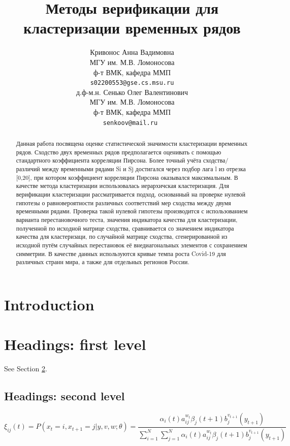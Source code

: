 \documentclass{article}
\title{Методы верификации для кластеризации временных рядов }
\author{ Кривонос Анна Вадимовна  \\
	МГУ им. М.В. Ломоносова\\
	ф-т ВМК, кафедра ММП\\
	\texttt{s02200553@gse.cs.msu.ru} \\
	\And
	д.ф-м.н. Сенько Олег Валентинович \\
	МГУ им. М.В. Ломоносова\\
	ф-т ВМК, кафедра ММП\\
	\texttt{senkoov@mail.ru } \\
}
\date{}
\begin{document}
\maketitle

\begin{abstract}
Данная работа посвящена оценке статистической значимости кластеризации временных рядов. Сходство двух временных рядов  предполагается оценивать с помощью стандартного коэффициента корреляции Пирсона. Более точный учёта сходства/различий между временными рядами Si и Sj достигался через подбор лага l из отрезка [0,20], при котором коэффициент корреляции Пирсона оказывался максимальным. В качестве метода кластеризации использовалась иерархичская кластеризация. Для верификации кластеризации рассматривается подход, основанный на проверке нулевой гипотезы о равновероятности различных соответствий мер сходства между двумя временными рядами. Проверка такой нулевой гипотезы производится с использованием варианта перестановочного теста, значения индикатора качества для кластеризации, полученной по исходной матрице сходства, сравнивается со значением индикатора качества для кластеризаци, по случайной матрице сходства, сгенерированной из исходной путём случайных перестановок её внедиагональных элементов с сохранением симметрии. В качестве данных используются кривые темпа роста Covid-19 для различных странн мира, а также для отдельных регионов России.
\end{abstract}



\section{Introduction}
\lipsum[2]
\lipsum[3]

\section{Headings: first level}
\label{sec:headings}

\lipsum[4] See Section \ref{sec:headings}.

\subsection{Headings: second level}
\lipsum[5]
\begin{equation}
	\xi _{ij}(t)=P(x_{t}=i,x_{t+1}=j|y,v,w;\theta)= {\frac {\alpha _{i}(t)a^{w_t}_{ij}\beta _{j}(t+1)b^{v_{t+1}}_{j}(y_{t+1})}{\sum _{i=1}^{N} \sum _{j=1}^{N} \alpha _{i}(t)a^{w_t}_{ij}\beta _{j}(t+1)b^{v_{t+1}}_{j}(y_{t+1})}}
\end{equation}
\end{document}
